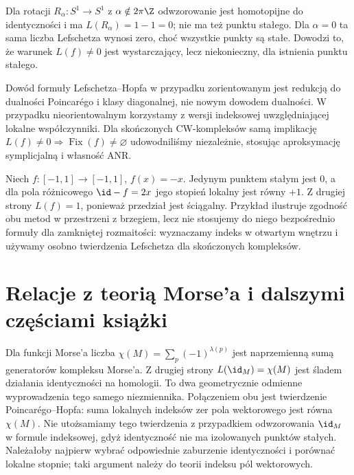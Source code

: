 \begin{przyklad}
Dla rotacji $R_\alpha:S^1\to S^1$ z $\alpha\notin2\pi\Z$
odwzorowanie jest homotopijne do identyczności i ma
$L(R_\alpha)=1-1=0$; nie ma też punktu stałego.
Dla $\alpha=0$ ta sama liczba Lefschetza wynosi zero,
choć wszystkie punkty są stałe. Dowodzi to, że
warunek $L(f)\ne0$ jest wystarczający, lecz niekonieczny,
dla istnienia punktu stałego.
\end{przyklad}

\begin{uwaga}
Dowód formuły Lefschetza--Hopfa w przypadku zorientowanym
jest redukcją do dualności Poincarégo i klasy diagonalnej,
nie nowym dowodem dualności. W przypadku nieorientowalnym
korzystamy z wersji indeksowej uwzględniającej lokalne
współczynniki. Dla skończonych CW-kompleksów samą
implikację $L(f)\ne0\Rightarrow\operatorname{Fix}(f)\ne\varnothing$
udowodniliśmy niezależnie, stosując aproksymację
symplicjalną i własność ANR.
\end{uwaga}

\begin{przyklad}
Niech $f:[-1,1]\to[-1,1]$, $f(x)=-x$. Jedynym
punktem stałym jest $0$, a dla pola różnicowego
$\id-f=2x$ jego stopień lokalny jest równy $+1$.
Z drugiej strony $L(f)=1$, ponieważ przedział jest
ściągalny. Przykład ilustruje zgodność obu metod
w przestrzeni z brzegiem, lecz nie stosujemy do niego
bezpośrednio formuły dla zamkniętej rozmaitości:
wyznaczamy indeks w otwartym wnętrzu i używamy
osobno twierdzenia Lefschetza dla skończonych kompleksów.
\end{przyklad}

\section{Relacje z teorią Morse'a i dalszymi częściami książki}
Dla funkcji Morse'a liczba $\chi(M)=\sum_p(-1)^{\lambda(p)}$
jest naprzemienną sumą generatorów kompleksu Morse'a.
Z drugiej strony $L(\id_M)=\chi(M)$ jest śladem działania
identyczności na homologii. To dwa geometrycznie odmienne
wyprowadzenia tego samego niezmiennika. Połączeniem obu
jest twierdzenie Poincarégo--Hopfa: suma lokalnych indeksów
zer pola wektorowego jest równa $\chi(M)$.
Nie utożsamiamy tego twierdzenia z przypadkiem odwzorowania
$\id_M$ w formule indeksowej, gdyż identyczność nie
ma izolowanych punktów stałych. Należałoby najpierw
wybrać odpowiednie zaburzenie identyczności i porównać
lokalne stopnie; taki argument należy do teorii indeksu
pól wektorowych.



